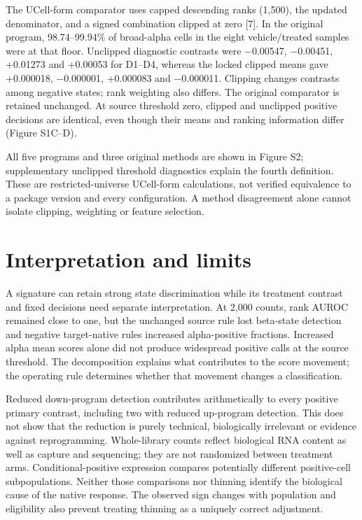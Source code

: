 \documentclass[11pt,letterpaper]{article}
\begin{document}
The UCell-form comparator uses capped descending ranks (1,500), the updated denominator, and a signed combination clipped at zero [7]. In the original program, 98.74–99.94\% of broad-alpha cells in the eight vehicle/treated samples were at that floor. Unclipped diagnostic contrasts were −0.00547, −0.00451, +0.01273 and +0.00053 for D1–D4, whereas the locked clipped means gave +0.000018, −0.000001, +0.000083 and −0.000011. Clipping changes contrasts among negative states; rank weighting also differs. The original comparator is retained unchanged. At source threshold zero, clipped and unclipped positive decisions are identical, even though their means and ranking information differ (Figure S1C–D).

All five programs and three original methods are shown in Figure S2; supplementary unclipped threshold diagnostics explain the fourth definition. These are restricted-universe UCell-form calculations, not verified equivalence to a package version and every configuration. A method disagreement alone cannot isolate clipping, weighting or feature selection.

\section*{Interpretation and limits}
A signature can retain strong state discrimination while its treatment contrast and fixed decisions need separate interpretation. At 2,000 counts, rank AUROC remained close to one, but the unchanged source rule lost beta-state detection and negative target-native rules increased alpha-positive fractions. Increased alpha mean scores alone did not produce widespread positive calls at the source threshold. The decomposition explains what contributes to the score movement; the operating rule determines whether that movement changes a classification.

Reduced down-program detection contributes arithmetically to every positive primary contrast, including two with reduced up-program detection. This does not show that the reduction is purely technical, biologically irrelevant or evidence against reprogramming. Whole-library counts reflect biological RNA content as well as capture and sequencing; they are not randomized between treatment arms. Conditional-positive expression compares potentially different positive-cell subpopulations. Neither those comparisons nor thinning identify the biological cause of the native response. The observed sign changes with population and eligibility also prevent treating thinning as a uniquely correct adjustment.
\end{document}
